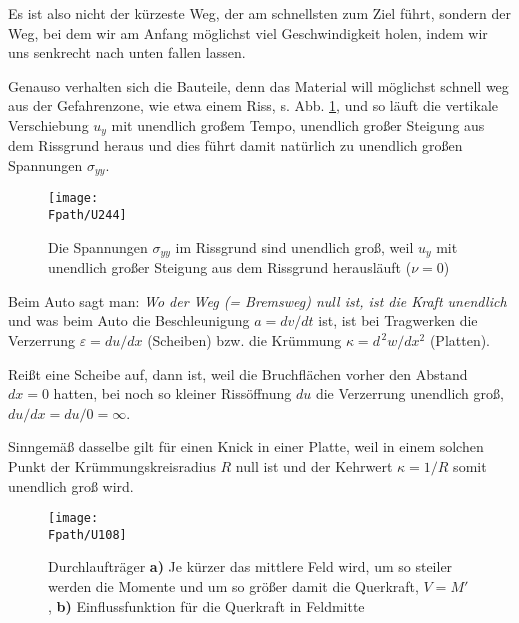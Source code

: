 Es ist also nicht der k\"{u}rzeste Weg, der am schnellsten zum Ziel f\"{u}hrt, sondern der Weg, bei dem wir am Anfang  m\"{o}glichst viel Geschwindigkeit holen, indem wir uns senkrecht nach unten fallen lassen.

Genauso verhalten sich die Bauteile, denn das Material will m\"{o}glichst schnell weg aus der Gefahrenzone, wie etwa einem Riss, s. Abb. \ref{U244}, und so l\"{a}uft die vertikale Verschiebung $u_y$ mit unendlich gro{\ss}em \glq Tempo\grq{}, unendlich gro{\ss}er Steigung aus dem Rissgrund heraus und dies f\"{u}hrt damit nat\"{u}rlich zu unendlich gro{\ss}en Spannungen $\sigma_{yy}$.

\begin{figure}[tbp]
\centering
\if {} \sidecaption \fi
\texttt{[image: \\Fpath/U244]}
\caption{Die Spannungen $\sigma_{yy}$ im Rissgrund sind unendlich gro{\ss}, weil $u_y$ mit unendlich gro{\ss}er Steigung aus dem Rissgrund herausl\"{a}uft ($\nu = 0$)} \label{U244}
\end{figure}%

Beim Auto sagt man: {\em  Wo der Weg (= Bremsweg) null ist, ist die Kraft
unendlich\/} und was beim Auto die Beschleunigung $a = dv/dt$ ist, ist bei Tragwerken die Verzerrung $\varepsilon = du/dx$ (Scheiben) bzw. die Kr\"{u}mmung $\kappa = d^{\,2}w/dx^2$ (Platten).

Rei{\ss}t eine Scheibe auf, dann ist, weil die Bruchfl\"{a}chen vorher den Abstand $dx = 0$ hatten, bei noch so kleiner Riss\"{o}ffnung $du$ die Verzerrung unendlich gro{\ss}, $du/dx = du/0 = \infty$.

Sinngem\"{a}{\ss} dasselbe gilt f\"{u}r einen Knick in einer Platte, weil in einem solchen Punkt der Kr\"{u}mmungskreisradius $R$ null ist und der Kehrwert $\kappa = 1/R$ somit unendlich gro{\ss} wird.
\begin{figure}
\centering
\texttt{[image: \\Fpath/U108]}
\caption{Durchlauftr\"{a}ger \textbf{ a)}
Je k\"{u}rzer das mittlere Feld wird, um so steiler werden die Momente und um so gr\"{o}{\ss}er damit die Querkraft, $V = M'$, \textbf{ b)}
Einflussfunktion f\"{u}r die Querkraft in Feldmitte}
\label{U108}%
\end{figure}%

